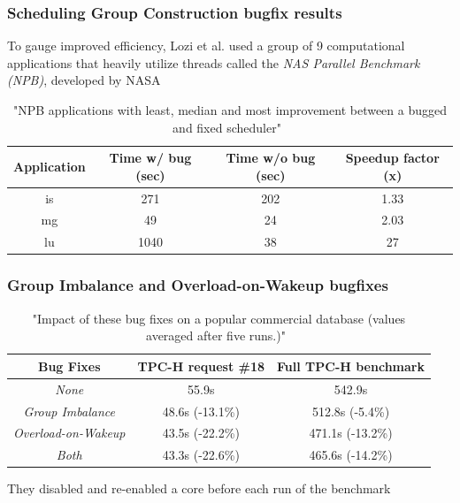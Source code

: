 \documentclass{beamer}
\begin{document}
\begin{frame}
\frametitle{Scheduling Group Construction bugfix results}

To gauge improved efficiency, Lozi et al. used a group of 9 computational applications that heavily utilize threads called the \emph{NAS Parallel Benchmark (NPB)}, developed by NASA

\begin{table}
	\centering
	\begin{tabular}{| c | c | c | c |}
		\hline			
	  	Application & Time w/ bug (sec) & Time w/o bug (sec) & Speedup factor (x) \\ \hline
		is & 271 & 202 & 1.33 \\ \hline
		mg & 49 & 24 & 2.03 \\ \hline
		lu & 1040 & 38 & 27 \\ \hline
		\hline
	\end{tabular}
	\caption{"NPB applications with least, median and most improvement between a bugged and fixed scheduler"~\cite{Lozi:2016}}
\end{table}

\end{frame}

\begin{frame}
\frametitle{Group Imbalance and Overload-on-Wakeup bugfixes}
\begin{table}
	\centering
	\begin{tabular}{| c | c | c |}
		\hline			
	  	Bug Fixes & TPC-H request \#18 & Full TPC-H benchmark \\ \hline
		\emph{None} & 55.9s & 542.9s \\ \hline
		\emph{Group Imbalance} & 48.6s (-13.1\%) & 512.8s (-5.4\%) \\
		\emph{Overload-on-Wakeup} & 43.5s (-22.2\%) & 471.1s (-13.2\%) \\
		\emph{Both} & 43.3s (-22.6\%) & 465.6s (-14.2\%) \\
		\hline
	\end{tabular}
	\caption{"Impact of these bug fixes on a popular commercial database (values averaged after five runs.)"~\cite{Lozi:2016}}
\end{table}

They disabled and re-enabled a core before each run of the benchmark
\end{frame}
\end{document}
